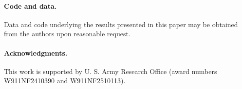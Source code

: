 \documentclass[11pt,a4paper,onecolumn]{article}
\begin{document}
\paragraph{Code and data.} Data and code underlying the results presented in this paper may be obtained from the authors upon reasonable request.

\paragraph{Acknowledgments.}  This work is supported by U. S. Army Research Office (award numbers W911NF2410390 and W911NF2510113).



\end{document}
